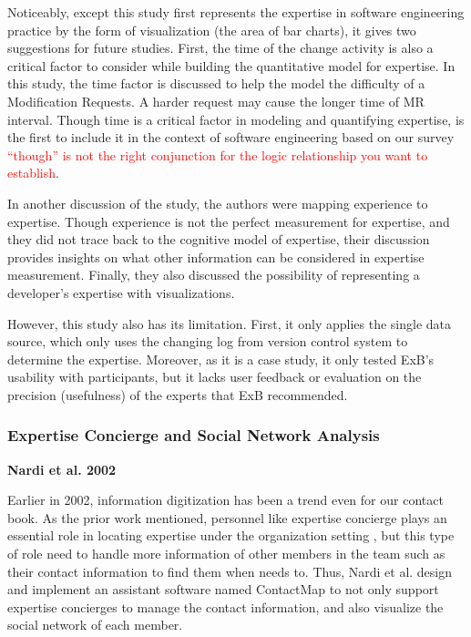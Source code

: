 Noticeably, except this study first represents the expertise in software engineering practice by the form of visualization (the area of bar charts), it gives two suggestions for future studies. First, the time of the change activity is also a critical factor to consider while building the quantitative model for expertise. In this study, the time factor is discussed to help the model the difficulty of a Modification Requests. A harder request may cause the longer time of MR interval. Though time is a critical factor in modeling and quantifying expertise, \citeauthor{mockus2002expertise} is the first to include it in the context of software engineering based on our survey \textcolor{red}{``though'' is not the right conjunction for the logic relationship you want to establish}.

In another discussion of the study, the authors were mapping experience to expertise. Though experience is not the perfect measurement for expertise, and they did not trace back to the cognitive model of expertise, their discussion provides insights on what other information can be considered in expertise measurement. Finally, they also discussed the possibility of representing a developer's expertise with visualizations. 

However, this study also has its limitation. First, it only applies the single data source, which only uses the changing log from version control system to determine the expertise. Moreover, as it is a case study, it only tested ExB's usability with participants, but it lacks user feedback or evaluation on the precision (usefulness) of the experts that ExB recommended.

\subsubsection{Expertise Concierge and Social Network Analysis}

\textbf{Nardi et al. 2002}

Earlier in 2002, information digitization has been a trend even for our contact book. As the prior work mentioned, personnel like expertise concierge plays an essential role in locating expertise under the organization setting \cite{mcdonald1998just}, but this type of role need to handle more information of other members in the team such as their contact information to find them when needs to. Thus, Nardi et al. design and implement an assistant software named ContactMap \cite{nardi2002integrating} to not only support expertise concierges to manage the contact information, and also visualize the social network of each member.


